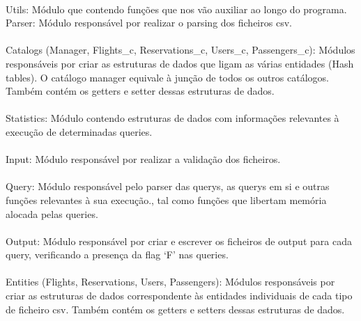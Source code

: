 \documentclass{article}
\begin{document}
\paragraph{}
Utils: Módulo que contendo funções que nos vão auxiliar ao longo do programa.
Parser: Módulo responsável por realizar o parsing dos ficheiros csv. 
\paragraph{}Catalogs (Manager, Flights\_c, Reservations\_c, Users\_c, Passengers\_c): Módulos responsáveis por criar as estruturas de dados que ligam as várias entidades (Hash tables). O catálogo manager equivale à junção de todos os outros catálogos. Também contém os getters e setter dessas estruturas de dados.
\paragraph{}Statistics: Módulo contendo estruturas de dados com informações relevantes à execução de determinadas queries. 
\paragraph{}Input: Módulo responsável por realizar a validação dos ficheiros. 
\paragraph{}Query: Módulo responsável pelo parser das querys, as querys em si e outras funções relevantes à sua execução., tal como funções que libertam memória alocada pelas queries. 
\paragraph{}Output: Módulo responsável por criar e escrever os ficheiros de output para cada query, verificando a presença da flag ‘F’ nas queries. 
\paragraph{}Entities (Flights, Reservations, Users, Passengers):  Módulos responsáveis por criar as estruturas de dados correspondente às entidades individuais de cada tipo de ficheiro csv. Também contém os getters e setters dessas estruturas de dados. 
\end{document}
